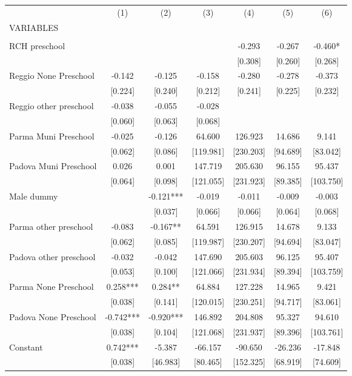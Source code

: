 \begin{tabular}{lcccccc} \hline
 & (1) & (2) & (3) & (4) & (5) & (6) \\
VARIABLES &  &  &  &  &  &  \\ \hline
 &  &  &  &  &  &  \\
RCH preschool &  &  &  & -0.293 & -0.267 & -0.460* \\
 &  &  &  & [0.308] & [0.260] & [0.268] \\
Reggio None Preschool & -0.142 & -0.125 & -0.158 & -0.280 & -0.278 & -0.373 \\
 & [0.224] & [0.240] & [0.212] & [0.241] & [0.225] & [0.232] \\
Reggio other preschool & -0.038 & -0.055 & -0.028 &  &  &  \\
 & [0.060] & [0.063] & [0.068] &  &  &  \\
Parma Muni Preschool & -0.025 & -0.126 & 64.600 & 126.923 & 14.686 & 9.141 \\
 & [0.062] & [0.086] & [119.981] & [230.203] & [94.689] & [83.042] \\
Padova Muni Preschool & 0.026 & 0.001 & 147.719 & 205.630 & 96.155 & 95.437 \\
 & [0.064] & [0.098] & [121.055] & [231.923] & [89.385] & [103.750] \\
Male dummy &  & -0.121*** & -0.019 & -0.011 & -0.009 & -0.003 \\
 &  & [0.037] & [0.066] & [0.066] & [0.064] & [0.068] \\
Parma other preschool & -0.083 & -0.167** & 64.591 & 126.915 & 14.678 & 9.133 \\
 & [0.062] & [0.085] & [119.987] & [230.207] & [94.694] & [83.047] \\
Padova other preschool & -0.032 & -0.042 & 147.690 & 205.603 & 96.125 & 95.407 \\
 & [0.053] & [0.100] & [121.066] & [231.934] & [89.394] & [103.759] \\
Parma None Preschool & 0.258*** & 0.284** & 64.884 & 127.228 & 14.965 & 9.421 \\
 & [0.038] & [0.141] & [120.015] & [230.251] & [94.717] & [83.061] \\
Padova None Preschool & -0.742*** & -0.920*** & 146.892 & 204.808 & 95.327 & 94.610 \\
 & [0.038] & [0.104] & [121.068] & [231.937] & [89.396] & [103.761] \\
Constant & 0.742*** & -5.387 & -66.157 & -90.650 & -26.236 & -17.848 \\
 & [0.038] & [46.983] & [80.465] & [152.325] & [68.919] & [74.609] \\

\end{tabular}
